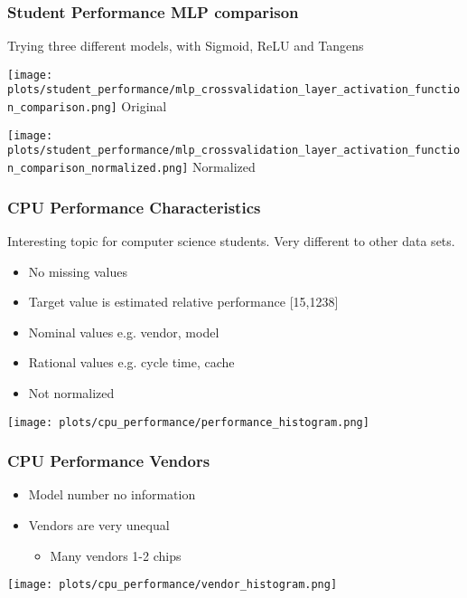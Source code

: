 \documentclass[aspectratio=169]{beamer}
\begin{document}
\begin{frame}{}
\frametitle{Student Performance MLP comparison}
\center Trying three different models, with Sigmoid, ReLU and Tangens
\begin{minipage}{0.49\textwidth}
    \texttt{[image: plots/student\_performance/mlp\_crossvalidation\_layer\_activation\_function\_comparison.png]}
    \center Original
\end{minipage}
\begin{minipage}{0.49\textwidth}
    \texttt{[image: plots/student\_performance/mlp\_crossvalidation\_layer\_activation\_function\_comparison\_normalized.png]}
    \center Normalized
\end{minipage}
\end{frame}

\begin{frame}{}
\frametitle{CPU Performance Characteristics}
Interesting topic for computer science students. Very different to other data sets.
\begin{minipage}{0.3\textwidth}
\begin{itemize}
\item No missing values
\item Target value is estimated relative performance [15,1238]
\item Nominal values e.g. vendor, model
\item Rational values e.g. cycle time, cache
\item Not normalized
\end{itemize}
\end{minipage}
\begin{minipage}{0.69\textwidth}
    \texttt{[image: plots/cpu\_performance/performance\_histogram.png]}
\end{minipage}
\end{frame}

\begin{frame}{}
\frametitle{CPU Performance Vendors}
\begin{minipage}{0.3\textwidth}
\begin{itemize}
\item Model number no information
\item Vendors are very unequal
\begin{itemize}
	\item Many vendors 1-2 chips
\end{itemize}
\end{itemize}
\end{minipage}
\begin{minipage}{0.69\textwidth}
    \texttt{[image: plots/cpu\_performance/vendor\_histogram.png]}
\end{minipage}
\end{frame}
\end{document}
